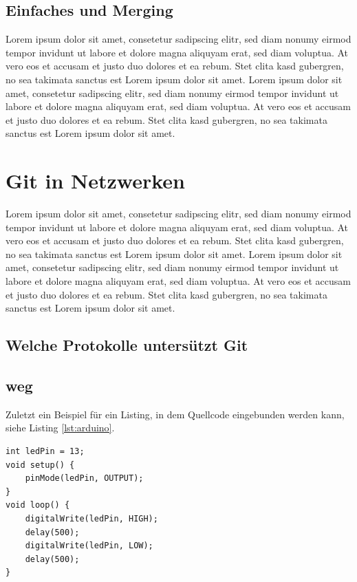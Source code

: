 \documentclass[12pt,a4paper,bibliography=totocnumbered,listof=totocnumbered]{scrartcl}
\begin{document}
\subsection{Einfaches und Merging}
Lorem ipsum dolor sit amet, consetetur sadipscing elitr, sed diam nonumy eirmod tempor invidunt ut labore et dolore magna aliquyam erat, sed diam voluptua. At vero eos et accusam et justo duo dolores et ea rebum. Stet clita kasd gubergren, no sea takimata sanctus est Lorem ipsum dolor sit amet. Lorem ipsum dolor sit amet, consetetur sadipscing elitr, sed diam nonumy eirmod tempor invidunt ut labore et dolore magna aliquyam erat, sed diam voluptua. At vero eos et accusam et justo duo dolores et ea rebum. Stet clita kasd gubergren, no sea takimata sanctus est Lorem ipsum dolor sit amet.
\pagebreak
\section{Git in Netzwerken}
Lorem ipsum dolor sit amet, consetetur sadipscing elitr, sed diam nonumy eirmod tempor invidunt ut labore et dolore magna aliquyam erat, sed diam voluptua. At vero eos et accusam et justo duo dolores et ea rebum. Stet clita kasd gubergren, no sea takimata sanctus est Lorem ipsum dolor sit amet. Lorem ipsum dolor sit amet, consetetur sadipscing elitr, sed diam nonumy eirmod tempor invidunt ut labore et dolore magna aliquyam erat, sed diam voluptua. At vero eos et accusam et justo duo dolores et ea rebum. Stet clita kasd gubergren, no sea takimata sanctus est Lorem ipsum dolor sit amet.

\subsection{Welche Protokolle untersützt Git}
\pagebreak

\subsection{weg}
Zuletzt ein Beispiel für ein Listing, in dem Quellcode eingebunden werden kann, siehe Listing \ref{lst:arduino}.

\vspace{1em}
\begin{lstlisting}[caption=Arduino Beispielprogramm, label=lst:arduino]
int ledPin = 13;
void setup() {
    pinMode(ledPin, OUTPUT);
}
void loop() {
    digitalWrite(ledPin, HIGH);
    delay(500);
    digitalWrite(ledPin, LOW);
    delay(500);
}
\end{lstlisting}
\end{document}
